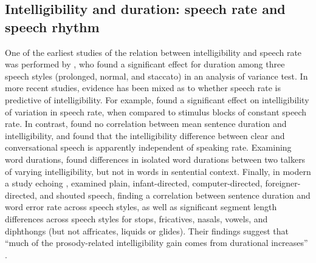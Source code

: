 

\subsection[Intelligibility and duration]{Intelligibility and duration: speech rate and speech rhythm}
One of the earliest studies of the relation between intelligibility and speech rate was performed by \citet{Tolhurst1957a}, who found a significant effect for duration among three speech styles (prolonged, normal, and staccato) in an analysis of variance test.  In more recent studies, evidence has been mixed as to whether speech rate is predictive of intelligibility.  For example, \citet{SommersEtAl1994} found a significant effect on intelligibility of variation in speech rate, when compared to stimulus blocks of constant speech rate.  In contrast, \citet{BradlowEtAl1996} found no correlation between mean sentence duration and intelligibility, and \citet{KrauseBraida2002} found that the intelligibility difference between clear and conversational speech is apparently independent of speaking rate.  Examining word durations, \citet{BondMoore1994} found differences in isolated word durations between two talkers of varying intelligibility, but not in words in sentential context.  Finally, in modern a study echoing \citet{Tolhurst1957a}, \citet{MayoEtAl2012} examined plain, infant-directed, computer-directed, foreigner-directed, and shouted speech, finding a correlation between sentence duration and word error rate across speech styles, as well as significant segment length differences across speech styles for stops, fricatives, nasals, vowels, and diphthongs (but not affricates, liquids or glides).  Their findings suggest that “much of the prosody-related intelligibility gain comes from durational increases” \citep{MayoEtAl2012}.


